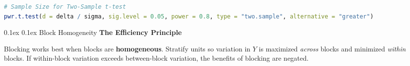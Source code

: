 \documentclass[8pt,landscape]{article}
\makeatletter
\renewcommand{\section}{\@startsection{section}{2}{0pt}%
    {0.1ex}%
    {0.1ex}%
    {\fontsize{8}{9}\bfseries\color{red}}} %
\newcommand{\smalltext}[1]{
  {\fontsize{8}{9}\selectfont\sloppy #1\par}
}
\makeatother
\begin{document}
\begin{multicols}{3}
\begin{lstlisting}[language=R]
# Sample Size for Two-Sample t-test
pwr.t.test(d = delta / sigma, sig.level = 0.05, power = 0.8, type = "two.sample", alternative = "greater")
\end{lstlisting}

\section{Block Homogeneity}
\textbf{The Efficiency Principle}
\smalltext{
Blocking works best when blocks are \textbf{homogeneous}. Stratify units so variation in $Y$ is maximized \textit{across} blocks and minimized \textit{within} blocks. If within-block variation exceeds between-block variation, the benefits of blocking are negated.
}

\end{multicols}
\end{document}
